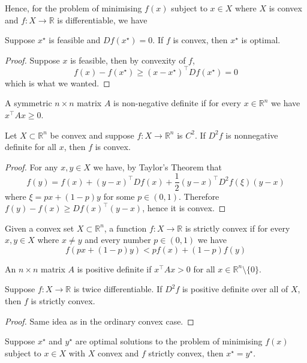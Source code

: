 Hence, for the problem of minimising $f(x)$ subject to $x\in X$ where $X$ is convex and $f:X\to\mathbb R$ is differentiable, we have
\begin{theorem}
    Suppose $x^\star$ is feasible and $Df(x^\star)=0$.
    If $f$ is convex, then $x^\star$ is optimal.
\end{theorem}
\begin{proof}
    Suppose $x$ is feasible, then by convexity of $f$,
    $$f(x)-f(x^\star)\ge(x-x^\star)^\top Df(x^\star)=0$$
    which is what we wanted.
\end{proof}
\begin{definition}
    A symmetric $n\times n$ matrix $A$ is non-negative definite if for every $x\in\mathbb R^n$ we have $x^\top Ax\ge 0$.
\end{definition}
\begin{theorem}
    Let $X\subset\mathbb R^n$ be convex and suppose $f:X\to\mathbb R^n$ is $C^2$.
    If $D^2f$ is nonnegative definite for all $x$, then $f$ is convex.
\end{theorem}
\begin{proof}
    For any $x,y\in X$ we have, by Taylor's Theorem that
    $$f(y)=f(x)+(y-x)^\top Df(x)+\frac{1}{2}(y-x)^\top D^2f(\xi)(y-x)$$
    where $\xi=px+(1-p)y$ for some $p\in(0,1)$.
    Therefore $f(y)-f(x)\ge Df(x)^\top(y-x)$, hence it is convex.
\end{proof}
\begin{definition}
    Given a convex set $X\subset\mathbb R^n$, a function $f:X\to\mathbb R$ is strictly convex if for every $x,y\in X$ where $x\neq y$ and every number $p\in (0,1)$ we have
    $$f(px+(1-p)y)<pf(x)+(1-p)f(y)$$
\end{definition}
\begin{definition}
    An $n\times n$ matrix $A$ is positive definite if $x^\top Ax>0$ for all $x\in\mathbb R^n\setminus\{0\}$.
\end{definition}
\begin{theorem}
    Suppose $f:X\to\mathbb R$ is twice differentiable.
    If $D^2f$ is positive definite over all of $X$, then $f$ is strictly convex.
\end{theorem}
\begin{proof}
    Same idea as in the ordinary convex case.
\end{proof}
\begin{theorem}
    Suppose $x^\star$ and $y^\star$ are optimal solutions to the problem of minimising $f(x)$ subject to $x\in X$ with $X$ convex and $f$ strictly convex, then $x^\star=y^\star$.
\end{theorem}
